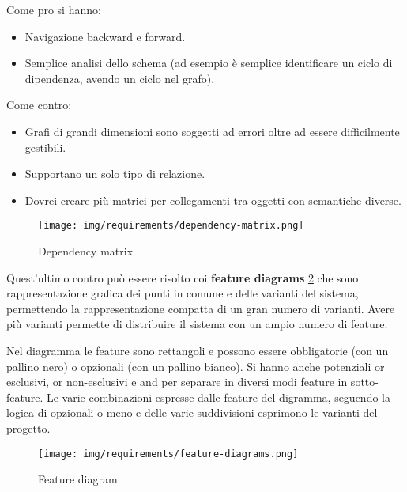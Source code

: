 Come pro si hanno:
\begin{itemize}
      \item Navigazione backward e forward.
      \item Semplice analisi dello schema (ad esempio è semplice identificare un
            ciclo di dipendenza, avendo un ciclo nel grafo).
\end{itemize}
Come contro:
\begin{itemize}
      \item Grafi di grandi dimensioni sono soggetti ad errori oltre ad essere
            difficilmente gestibili.
      \item Supportano un solo tipo di relazione.
      \item Dovrei creare più matrici per collegamenti tra oggetti con semantiche
            diverse.
\end{itemize}
\begin{figure}[!ht]
      \centering
      \texttt{[image: img/requirements/dependency-matrix.png]}
      \caption{Dependency matrix}
      \label{fig:dependency-matrix}
\end{figure}
Quest'ultimo contro può essere risolto coi \textbf{feature diagrams}
\ref{fig:feature-diagram} che sono rappresentazione grafica dei punti in comune
e delle varianti del sistema, permettendo la rappresentazione compatta di un
gran numero di varianti. Avere più varianti permette di distribuire il sistema
con un ampio numero di feature.

Nel diagramma le feature sono rettangoli e possono essere obbligatorie (con un
pallino nero) o opzionali (con un pallino bianco). Si hanno anche potenziali or
esclusivi, or non-esclusivi e and per separare in diversi modi feature in
sotto-feature. Le varie combinazioni espresse dalle feature del digramma, seguendo
la logica di opzionali o meno e delle varie suddivisioni esprimono le varianti
del progetto.
\begin{figure}[!ht]
      \centering
      \texttt{[image: img/requirements/feature-diagrams.png]}
      \caption{Feature diagram}
      \label{fig:feature-diagram}
\end{figure}
